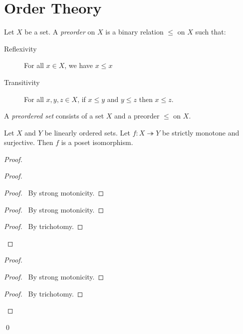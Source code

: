 \section{Order Theory}

\begin{definition}[Preorder]
    Let $X$ be a set. A \emph{preorder} on $X$ is a binary relation $\leq$ on $X$ such that:
    \begin{description}
        \item[Reflexivity] For all $x \in X$, we have $x \leq x$
        \item[Transitivity] For all $x, y, z \in X$, if $x \leq y$ and $y \leq z$ then $x \leq z$.  
    \end{description}
\end{definition}

\begin{definition}
    A \emph{preordered set} consists of a set $X$ and a preorder $\leq$ on $X$.
\end{definition}

\begin{proposition}
    \label{proposition:iso_strictly_monotone_sujective}
    Let $X$ and $Y$ be linearly ordered sets. Let $f : X \twoheadrightarrow Y$ be strictly monotone and surjective.
    Then $f$ is a poset isomorphism.
\end{proposition}

\begin{proof}
    \pf
    \begin{proof}
        \begin{proof}
            \pf\ By strong motonicity.
        \end{proof}
        \begin{proof}
            \pf\ By strong motonicity.
        \end{proof}
        \begin{proof}
            \pf\ By trichotomy.
        \end{proof}
    \end{proof}
    \begin{proof}
        \begin{proof}
            \pf\ By strong motonicity.
        \end{proof}
        \begin{proof}
            \pf\ By trichotomy.
        \end{proof}
    \end{proof}
    \qed
\end{proof}

